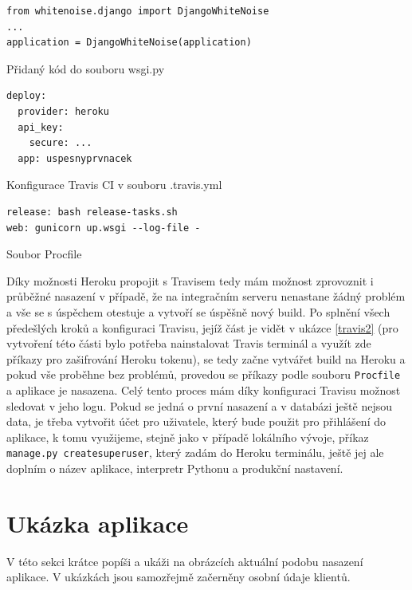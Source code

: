     \begin{listing}[ht]
    	\begin{verbatim}
from whitenoise.django import DjangoWhiteNoise
...
application = DjangoWhiteNoise(application)
    	\end{verbatim}
    	\caption{Přidaný kód do souboru wsgi.py}\label{lst:wsgi}
    \end{listing}
    
    \begin{listing}[ht]
    	\begin{verbatim}
deploy:
  provider: heroku
  api_key:
    secure: ...
  app: uspesnyprvnacek
    	\end{verbatim}
    	\caption{Konfigurace Travis CI v souboru .travis.yml}\label{travis2}
    \end{listing}
    
    \begin{listing}[ht]
    	\begin{verbatim}
release: bash release-tasks.sh
web: gunicorn up.wsgi --log-file -
    	\end{verbatim}
    	\caption{Soubor Procfile}\label{lst:procfile}
    \end{listing}
    
    Díky možnosti Heroku propojit s Travisem \cite{travis-heroku} tedy mám možnost zprovoznit i průběžné nasazení v případě, že na integračním serveru nenastane žádný problém a vše se s úspěchem otestuje a vytvoří se úspěšně nový build. Po splnění všech předešlých kroků a konfiguraci Travisu, jejíž část je vidět v ukázce \ref{travis2} (pro vytvoření této části bylo potřeba nainstalovat Travis terminál a využít zde příkazy pro zašifrování Heroku tokenu), se tedy začne vytvářet build na Heroku a pokud vše proběhne bez problémů, provedou se příkazy podle souboru \verb|Procfile| a aplikace je nasazena. Celý tento proces mám díky konfiguraci Travisu možnost sledovat v jeho logu. Pokud se jedná o první nasazení a v databázi ještě nejsou data, je třeba vytvořit účet pro uživatele, který bude použit pro přihlášení do aplikace, k tomu využijeme, stejně jako v případě lokálního vývoje, příkaz \verb|manage.py createsuperuser|, který zadám do Heroku terminálu, ještě jej ale doplním o název aplikace, interpretr Pythonu a produkční nastavení.
    
    \section{Ukázka aplikace}
    V této sekci krátce popíši a ukáži na obrázcích aktuální podobu nasazení aplikace. V ukázkách jsou samozřejmě začerněny osobní údaje klientů.
    

